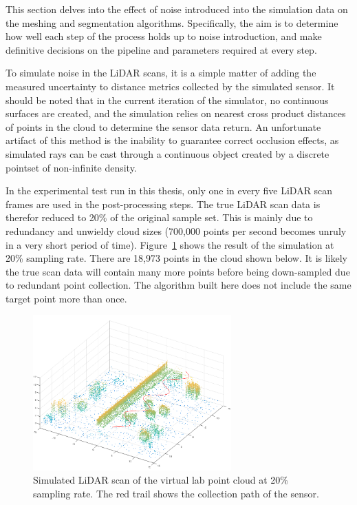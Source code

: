 \documentclass[12pt]{drexelthesis}
\begin{document}
This section delves into the effect of noise introduced into the simulation data on the meshing and segmentation algorithms. Specifically, the aim is to determine how well each step of the process holds up to noise introduction, and make definitive decisions on the pipeline and parameters required at every step.

To simulate noise in the LiDAR scans, it is a simple matter of adding the measured uncertainty to distance metrics collected by the simulated sensor. It should be noted that in the current iteration of the simulator, no continuous surfaces are created, and the simulation relies on nearest cross product distances of points in the cloud to determine the sensor data return. An unfortunate artifact of this method is the inability to guarantee correct occlusion effects, as simulated rays can be cast through a continuous object created by a discrete pointset of non-infinite density.

In the experimental test run in this thesis, only one in every five LiDAR scan frames are used in the post-processing steps. The true LiDAR scan data is therefor reduced to 20\% of the original sample set. This is mainly due to redundancy and unwieldy cloud sizes (700,000 points per second becomes unruly in a very short period of time). Figure~\ref{lidarsim:20psample} shows the result of the simulation at 20\% sampling rate. There are 18,973 points in the cloud shown below. It is likely the true scan data will contain many more points before being down-sampled due to redundant point collection. The algorithm built here does not include the same target point more than once.

\begin{figure}[!ht]
	\centering
	\includegraphics[width=3in]{simulated-lab-scan/lidarSim/20psample.png}
	\caption[Simulated LiDAR scan at 20\% sampling rate]{\centering Simulated LiDAR scan of the virtual lab point cloud at 20\% sampling rate. The red trail shows the collection path of the sensor.}
	\label{lidarsim:20psample}
\end{figure}
\end{document}
